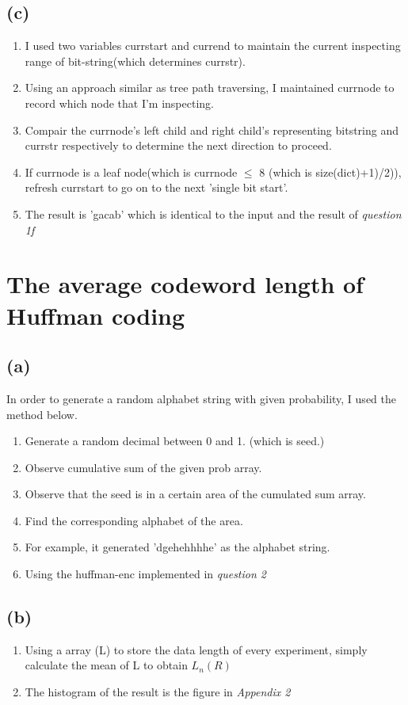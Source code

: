 \documentclass{article}
\begin{document}
\begin{CJK*}{UTF8}{bsmi}
\subsection{(c)}
\begin{enumerate}
    \item I used two variables currstart and currend to maintain the current inspecting range of bit-string(which determines currstr).
    \item Using an approach similar as tree path traversing, I maintained currnode to record which node that I'm inspecting.
    \item Compair the currnode's left child and right child's representing bitstring and currstr respectively to determine the next direction to proceed. 
    \item If currnode is a leaf node(which is currnode $\leq$ 8 (which is size(dict)+1)/2)), refresh currstart to go on to the next 'single bit start'.
    \item The result is 'gacab' which is identical to the input and the result of \emph{question 1f}
\end{enumerate}


\section{The average codeword length of Huffman coding}
\subsection{(a)}
\quad In order to generate a random alphabet string with given probability, I used the method below.
\begin{enumerate}
    \item Generate a random decimal between 0 and 1. (which is seed.)
    \item Observe cumulative sum of the given prob array.
    \item Observe that the seed is in a certain area of the cumulated sum array.
    \item Find the corresponding alphabet of the area.
    \item For example, it generated 'dgehehhhhe' as the alphabet string.
    \item Using the huffman-enc implemented in \emph{question 2}
\end{enumerate}

\subsection{(b)}
\begin{enumerate}
    \item Using a array (L) to store the data length of every experiment, simply calculate the mean of L to obtain $L_{n}(R)$
    \item The histogram of the result is the figure in \emph{Appendix 2}
\end{enumerate}


\end{CJK*}
\end{document}
